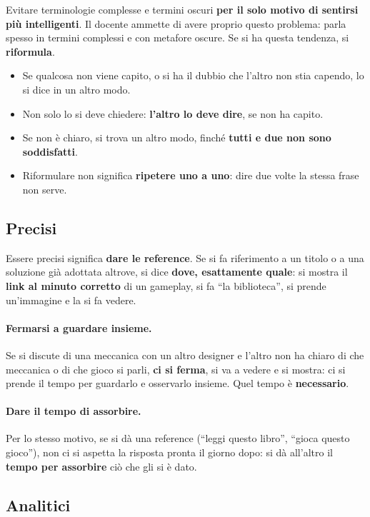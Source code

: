 Evitare terminologie complesse e termini oscuri \textbf{per il solo motivo
di sentirsi più intelligenti}. Il docente ammette di avere proprio questo
problema: parla spesso in termini complessi e con metafore oscure. Se si ha
questa tendenza, si \textbf{riformula}.
\begin{itemize}
  \item Se qualcosa non viene capito, o si ha il dubbio che l'altro non
        stia capendo, lo si dice in un altro modo.
  \item Non solo lo si deve chiedere: \textbf{l'altro lo deve dire}, se non
        ha capito.
  \item Se non è chiaro, si trova un altro modo, finché \textbf{tutti e due
        non sono soddisfatti}.
  \item Riformulare non significa \textbf{ripetere uno a uno}: dire due
        volte la stessa frase non serve.
\end{itemize}

\subsection{Precisi}

Essere precisi significa \textbf{dare le reference}. Se si fa riferimento a
un titolo o a una soluzione già adottata altrove, si dice \textbf{dove,
esattamente quale}: si mostra il \textbf{link al minuto corretto} di un
gameplay, si fa ``la biblioteca'', si prende un'immagine e la si fa vedere.

\paragraph{Fermarsi a guardare insieme.} Se si discute di una meccanica con
un altro designer e l'altro non ha chiaro di che meccanica o di che gioco si
parli, \textbf{ci si ferma}, si va a vedere e si mostra: ci si prende il
tempo per guardarlo e osservarlo insieme. Quel tempo è
\textbf{necessario}.

\paragraph{Dare il tempo di assorbire.} Per lo stesso motivo, se si dà una
reference (``leggi questo libro'', ``gioca questo gioco''), non ci si aspetta
la risposta pronta il giorno dopo: si dà all'altro il \textbf{tempo per
assorbire} ciò che gli si è dato.

\subsection{Analitici}

